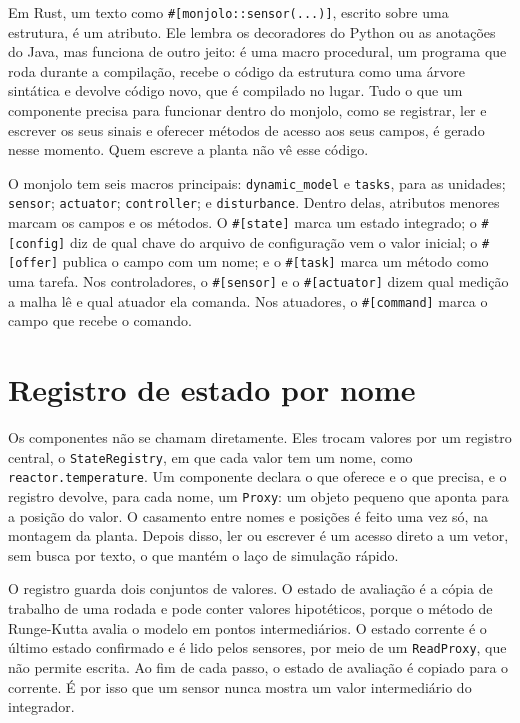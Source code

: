 Em Rust, um texto como \texttt{\#[monjolo::sensor(...)]}, escrito sobre uma estrutura, é um atributo. Ele lembra os decoradores do Python ou as anotações do Java, mas funciona de outro jeito: é uma macro procedural, um programa que roda durante a compilação, recebe o código da estrutura como uma árvore sintática e devolve código novo, que é compilado no lugar. Tudo o que um componente precisa para funcionar dentro do monjolo, como se registrar, ler e escrever os seus sinais e oferecer métodos de acesso aos seus campos, é gerado nesse momento. Quem escreve a planta não vê esse código.

O monjolo tem seis macros principais: \texttt{dynamic\_model} e \texttt{tasks}, para as unidades; \texttt{sensor}; \texttt{actuator}; \texttt{controller}; e \texttt{disturbance}. Dentro delas, atributos menores marcam os campos e os métodos. O \texttt{\#[state]} marca um estado integrado; o \texttt{\#[config]} diz de qual chave do arquivo de configuração vem o valor inicial; o \texttt{\#[offer]} publica o campo com um nome; e o \texttt{\#[task]} marca um método como uma tarefa. Nos controladores, o \texttt{\#[sensor]} e o \texttt{\#[actuator]} dizem qual medição a malha lê e qual atuador ela comanda. Nos atuadores, o \texttt{\#[command]} marca o campo que recebe o comando.

\section{Registro de estado por nome}
\label{apC:registro}

Os componentes não se chamam diretamente. Eles trocam valores por um registro central, o \texttt{StateRegistry}, em que cada valor tem um nome, como \texttt{reactor.temperature}. Um componente declara o que oferece e o que precisa, e o registro devolve, para cada nome, um \texttt{Proxy}: um objeto pequeno que aponta para a posição do valor. O casamento entre nomes e posições é feito uma vez só, na montagem da planta. Depois disso, ler ou escrever é um acesso direto a um vetor, sem busca por texto, o que mantém o laço de simulação rápido.

O registro guarda dois conjuntos de valores. O estado de avaliação é a cópia de trabalho de uma rodada e pode conter valores hipotéticos, porque o método de Runge-Kutta avalia o modelo em pontos intermediários. O estado corrente é o último estado confirmado e é lido pelos sensores, por meio de um \texttt{ReadProxy}, que não permite escrita. Ao fim de cada passo, o estado de avaliação é copiado para o corrente. É por isso que um sensor nunca mostra um valor intermediário do integrador.

